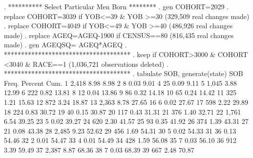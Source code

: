 {\smallskip}
. **********  Select Particular Men Born ********
. gen COHORT=2029
{\smallskip}
. replace COHORT=3039 if YOB<=39 \& YOB >=30
(329,509 real changes made)
{\smallskip}
. replace COHORT=4049 if YOB<=49 \& YOB >=40
(486,926 real changes made)
{\smallskip}
. replace AGEQ=AGEQ-1900 if CENSUS==80
(816,435 real changes made)
{\smallskip}
. gen AGEQSQ= AGEQ*AGEQ
{\smallskip}
. *************************************
. keep if COHORT>3000 \& COHORT <3040 \& RACE==1
(1,036,721 observations deleted)
{\smallskip}
. *************************************
. tabulate SOB, generate(state)
{\smallskip}
        SOB {\VBAR}      Freq.     Percent        Cum.
          1 {\VBAR}      2,418        8.98        8.98
          2 {\VBAR}          8        0.03        9.01
          4 {\VBAR}         25        0.09        9.11
          5 {\VBAR}      1,045        3.88       12.99
          6 {\VBAR}        222        0.82       13.81
          8 {\VBAR}         12        0.04       13.86
          9 {\VBAR}         86        0.32       14.18
         10 {\VBAR}         65        0.24       14.42
         11 {\VBAR}        325        1.21       15.63
         12 {\VBAR}        872        3.24       18.87
         13 {\VBAR}      2,363        8.78       27.65
         16 {\VBAR}          6        0.02       27.67
         17 {\VBAR}        598        2.22       29.89
         18 {\VBAR}        224        0.83       30.72
         19 {\VBAR}         40        0.15       30.87
         20 {\VBAR}        117        0.43       31.31
         21 {\VBAR}        376        1.40       32.71
         22 {\VBAR}      1,761        6.54       39.25
         23 {\VBAR}          5        0.02       39.27
         24 {\VBAR}        620        2.30       41.57
         25 {\VBAR}         93        0.35       41.92
         26 {\VBAR}        374        1.39       43.31
         27 {\VBAR}         21        0.08       43.38
         28 {\VBAR}      2,485        9.23       52.62
         29 {\VBAR}        456        1.69       54.31
         30 {\VBAR}          5        0.02       54.33
         31 {\VBAR}         36        0.13       54.46
         32 {\VBAR}          2        0.01       54.47
         33 {\VBAR}          4        0.01       54.49
         34 {\VBAR}        428        1.59       56.08
         35 {\VBAR}          7        0.03       56.10
         36 {\VBAR}        912        3.39       59.49
         37 {\VBAR}      2,387        8.87       68.36
         38 {\VBAR}          7        0.03       68.39
         39 {\VBAR}        667        2.48       70.87
